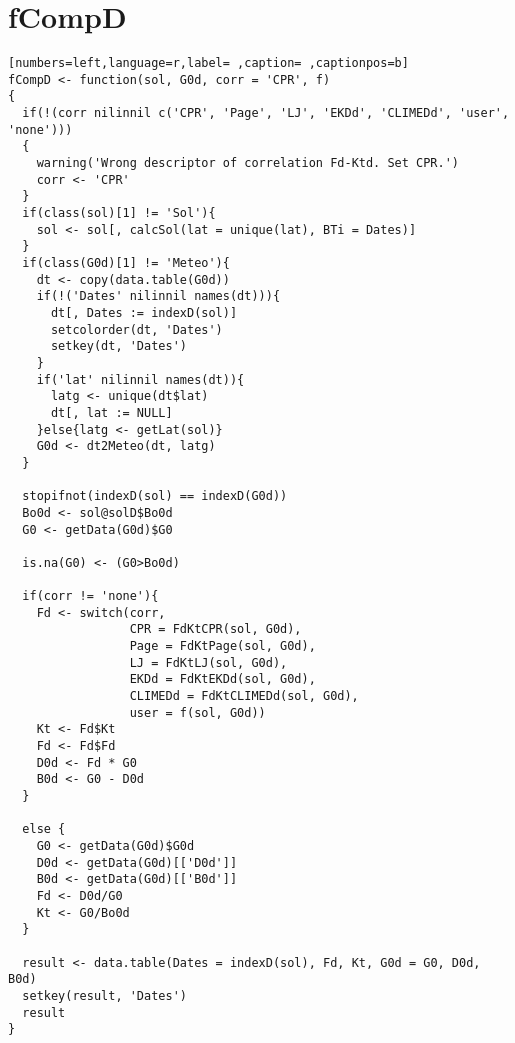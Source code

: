 \section{fCompD}
\label{sec:org972f01e}
\begin{lstlisting}[numbers=left,language=r,label= ,caption= ,captionpos=b]
fCompD <- function(sol, G0d, corr = 'CPR', f)
{
  if(!(corr nilinnil c('CPR', 'Page', 'LJ', 'EKDd', 'CLIMEDd', 'user', 'none')))
  {
    warning('Wrong descriptor of correlation Fd-Ktd. Set CPR.')
    corr <- 'CPR'
  }
  if(class(sol)[1] != 'Sol'){
    sol <- sol[, calcSol(lat = unique(lat), BTi = Dates)]
  }
  if(class(G0d)[1] != 'Meteo'){
    dt <- copy(data.table(G0d))
    if(!('Dates' nilinnil names(dt))){
      dt[, Dates := indexD(sol)]
      setcolorder(dt, 'Dates')
      setkey(dt, 'Dates')
    }
    if('lat' nilinnil names(dt)){
      latg <- unique(dt$lat)
      dt[, lat := NULL]
    }else{latg <- getLat(sol)}
    G0d <- dt2Meteo(dt, latg)
  }  

  stopifnot(indexD(sol) == indexD(G0d))
  Bo0d <- sol@solD$Bo0d
  G0 <- getData(G0d)$G0

  is.na(G0) <- (G0>Bo0d)

  if(corr != 'none'){
    Fd <- switch(corr,
                 CPR = FdKtCPR(sol, G0d),
                 Page = FdKtPage(sol, G0d),
                 LJ = FdKtLJ(sol, G0d),
                 EKDd = FdKtEKDd(sol, G0d),
                 CLIMEDd = FdKtCLIMEDd(sol, G0d),
                 user = f(sol, G0d))
    Kt <- Fd$Kt
    Fd <- Fd$Fd
    D0d <- Fd * G0
    B0d <- G0 - D0d
  }

  else {
    G0 <- getData(G0d)$G0d
    D0d <- getData(G0d)[['D0d']]
    B0d <- getData(G0d)[['B0d']]
    Fd <- D0d/G0
    Kt <- G0/Bo0d
  }

  result <- data.table(Dates = indexD(sol), Fd, Kt, G0d = G0, D0d, B0d)
  setkey(result, 'Dates')
  result
}
\end{lstlisting}
